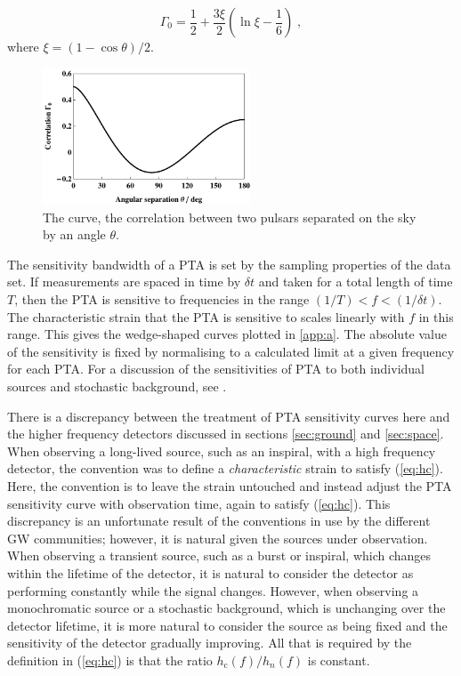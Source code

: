 \begin{equation}
\Gamma_{0} = \frac{1}{2}+\frac{3\xi}{2}\left(\ln \xi -\frac{1}{6}\right) \; ,
\end{equation}
where $\xi = (1-\cos\theta)/{2}.$
\begin{figure}
 \centering
 \includegraphics[trim=0cm 0cm 0cm 0cm, width=0.55\textwidth]{Fig_Hellings_Downs}
 \caption{The \citet{HellingsDowns} curve, the correlation between two pulsars separated on the sky by an angle $\theta$.}
 \label{fig:HnD}
\end{figure}

The sensitivity bandwidth of a PTA is set by the sampling properties of the data set. If measurements are spaced in time by $\delta t$ and taken for a total length of time $T$, then the PTA is sensitive to frequencies in the range $(1/T) < f < (1/\delta t)$. The characteristic strain that the PTA is sensitive to scales linearly with $f$ in this range. This gives the wedge-shaped curves plotted in \ref{app:a}. The absolute value of the sensitivity is fixed by normalising to a calculated limit at a given frequency for each PTA. For a discussion of the sensitivities of PTA to both individual sources and stochastic background, see \citet{MooreTaylorGair}.

There is a discrepancy between the treatment of PTA sensitivity curves here and the higher frequency detectors discussed in sections \ref{sec:ground} and \ref{sec:space}. When observing a long-lived source, such as an inspiral, with a high frequency detector, the convention was to define a \emph{characteristic} strain to satisfy (\ref{eq:hc}). Here, the convention is to leave the strain untouched and instead adjust the PTA sensitivity curve with observation time, again to satisfy (\ref{eq:hc}). This discrepancy is an unfortunate result of the conventions in use by the different GW communities; however, it is natural given the sources under observation. When observing a transient source, such as a burst or inspiral, which changes within the lifetime of the detector, it is natural to consider the detector as performing constantly while the signal changes. However, when observing a monochromatic source or a stochastic background, which is unchanging over the detector lifetime, it is more natural to consider the source as being fixed and the sensitivity of the detector gradually improving. All that is required by the definition in (\ref{eq:hc}) is that the ratio $h_\mathrm{c}(f)/h_{n}(f)$ is constant.


